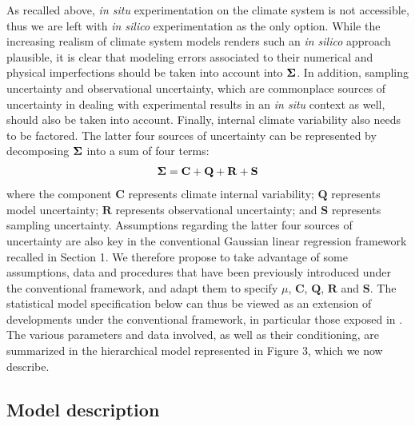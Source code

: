 \documentclass[12pt]{article}
\newcommand{\Sig}{\mbox{\boldmath \(\Sigma\)}}
\begin{document}
As recalled above, \textit{in situ} experimentation on the climate system is not accessible, thus we are left with \textit{in silico} experimentation as the only option. While the increasing realism of climate system models renders such an \textit{in silico} approach plausible, it is clear that modeling errors associated to their numerical and physical imperfections should be taken into account into $\Sig$. In addition, sampling uncertainty and observational uncertainty, which are commonplace sources of uncertainty in dealing with experimental results in an \textit{in situ} context as well, should also be taken into account. Finally, internal climate variability also needs to be factored. The latter four sources of uncertainty can be represented by decomposing $\Sig$ into a sum of four terms:
\begin{equation} 
\label{sigsum}
\begin{array}{lll}
\Sig = \mathbf C + \mathbf Q + \mathbf R + \mathbf S 
\end{array}
\end{equation}
where the component $\mathbf C$ represents climate internal variability; $\mathbf Q$ represents model uncertainty; $\mathbf R$ represents observational uncertainty; and $\mathbf S$ represents sampling uncertainty. Assumptions regarding the latter four sources of uncertainty are also key in the conventional Gaussian linear regression framework recalled in Section 1. We therefore propose to take advantage of some assumptions, data and procedures that have been previously introduced under the conventional framework, and adapt them to specify $\mu$, $\mathbf C$, $\mathbf Q$, $\mathbf R$ and $\mathbf S$. %
The statistical model specification below can thus be viewed as an extension of developments under the conventional framework, in particular those exposed in \cite{Han16}. The various parameters and data involved, as well as their conditioning, are summarized in the hierarchical model represented in Figure 3, which we now describe.

\subsection{Model description}
\end{document}

